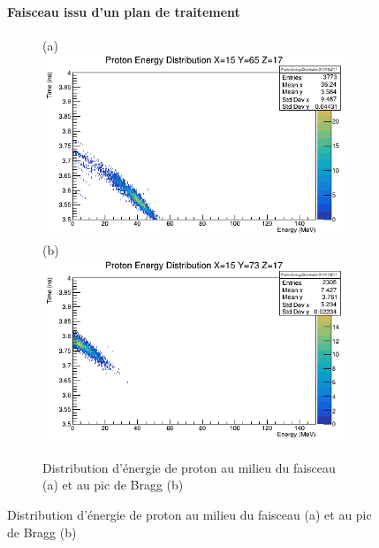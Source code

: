 \documentclass[11pt,a4paper,oldfontcommands]{memoir}
\begin{document}
\begin{figure}
\paragraph{Faisceau issu d'un plan de traitement}
\begin{figure}[h!]
\centering
\subfloat(a){\includegraphics[scale=0.37]{CT/TPS/faisceauprot.png}}
\subfloat(b){\includegraphics[scale=0.37]{CT/TPS/BraggProt.png}}
\caption{Distribution d'énergie de proton au milieu du faisceau (a) et au pic de Bragg (b)}
\label{tps prot}
\end{figure}


\end{figure}
\end{document}
